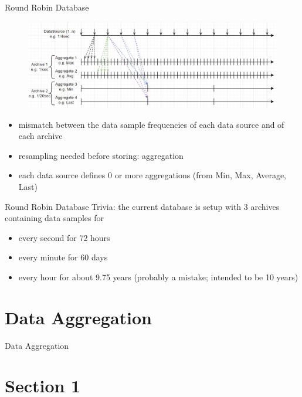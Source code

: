 \documentclass[t 9pt]{beamer}
\begin{document}
    \begin{frame}[t]{Round Robin Database}
        \begin{figure}
            \includegraphics[scale=0.35]{rrdb-structure.jpg}
        \end{figure}
        \begin{itemize}
            \item mismatch between the data sample frequencies of each data source and of each archive
            \item resampling needed before storing: aggregation
            \item each data source defines 0 or more aggregations (from Min, Max, Average, Last)
        \end{itemize}
    \end{frame}

    \begin{frame}[t]{Round Robin Database}
        Trivia: the current database is setup with 3 archives containing data samples for
        \begin{itemize}
            \item every second for 72 hours
            \item every minute for 60 days
            \item every hour for about 9.75 years (probably a mistake; intended to be 10 years)
        \end{itemize}
    \end{frame}

    \section{Data Aggregation}

    \begin{frame}[t]{Data Aggregation}
    \end{frame}


    \section{Section 1}
\end{document}
